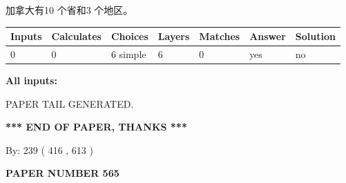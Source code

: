 \documentclass{ctexart}
\begin{document}
 
加拿大有10 个省和3 个地区。
 
 
\noindent{}
 
 
   
   
   
   
\noindent\begin{tabular}{|l|l|l|l|l|l|l|}
 \hline
Inputs & Calculates & Choices & Layers & Matches & Answer & Solution \\ \hline
 0  & 
 0  & 
 6
  simple  
  & 
 6  & 
 0  & 
  yes & 
  no 
  \\ \hline
 \end{tabular}
   
   
   
   
\noindent{}
   
   
   
   
\noindent\vspace{0.1in}\hspace{-0.08in} {\textbf{\Large{All inputs: }}}
   
   
   
   
   
   
 \vspace{0.2in}
 
   
   
\vspace{2.0in} PAPER TAIL GENERATED.
   
   
   
   
\vspace{1.0in} 
{\textbf{\large{ *** END OF PAPER, THANKS *** }}} 
   
   
\hspace{1.0in} By: 
 239 ( 416 ,  613 )
   
   
   
   
\newpage 
\setcounter{page}{ 
   565001 } 
   
   
   
   
 {\textbf{ \Large{ PAPER NUMBER  565  }}}
   
   
\vspace{0.2in}
   
   
   
   
   
   
   
\end{document}
